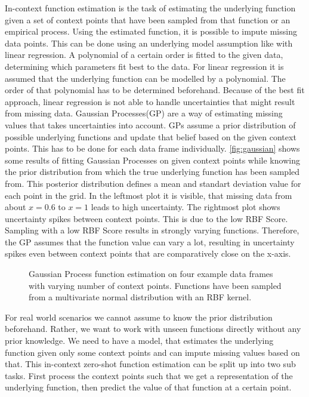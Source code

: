 In-context function estimation is the task of estimating the underlying function given a set of context points that have been sampled from that function or an empirical process. Using the estimated function, it is possible to impute missing data points. 
This can be done using an underlying model assumption like with linear regression. A polynomial of a certain order is fitted to the given data, determining which parameters fit best to the data. For linear regression it is assumed that the underlying function can be modelled by a polynomial. The order of that polynomial has to be determined beforehand. Because of the best fit approach, linear regression is not able to handle uncertainties that might result from missing data. Gaussian Processes(GP) are a way of estimating missing values that takes uncertainties into account. GPs assume a prior distribution of possible underlying functions and update that belief based on the given context points. This has to be done for each data frame individually. \autoref{fig:gaussian} shows some results of fitting Gaussian Processes on given context points while knowing the prior distribution from which the true underlying function has been sampled from. This posterior distribution defines a mean and standart deviation value for each point in the grid. In the leftmost plot it is visible, that missing data from about $x=0.6$ to $x=1$ leads to high uncertainty. The rightmost plot shows uncertainty spikes between context points. This is due to the low RBF Score. Sampling with a low RBF Score results in strongly varying functions. Therefore, the GP assumes that the function value can vary a lot, resulting in uncertainty spikes even between context points that are comparatively close on the x-axis.

\begin{figure*}
	\centering
	\resizebox{0.90\textwidth}{!}{
		
		
		
	}
\caption{Gaussian Process function estimation on four example data frames with varying number of context points. Functions have been sampled from a multivariate normal distribution with an RBF kernel.}
\label{fig:gaussian}
\end{figure*}

For real world scenarios we cannot assume to know the prior distribution beforehand. Rather, we want to work with unseen functions directly without any prior knowledge. We need to have a model, that estimates the underlying function given only some context points and can impute missing values based on that. This in-context zero-shot function estimation can be split up into two sub tasks. First process the context points such that we get a representation of the underlying function, then predict the value of that function at a certain point.

